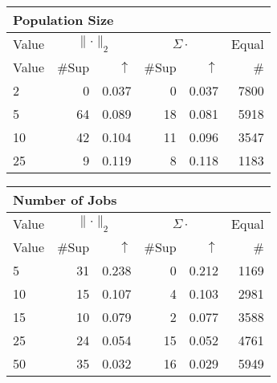 \begin{center}
\renewcommand{\tabcolsep}{4pt}
\renewcommand{\arraystretch}{1.1}
\begin{customnormal}
\begin{tabular}{lrrrrr}
\multicolumn{6}{l}{Population Size}\\
\toprule
\multicolumn{1}{c}{Value} & \multicolumn{2}{c}{$\lVert \cdot \rVert_2$} & \multicolumn{2}{c}{$\Sigma \cdot$} & \multicolumn{1}{c}{Equal} \\ 
\cmidrule(lr){1-1} \cmidrule(lr){2-3} \cmidrule(lr){4-5}  \cmidrule(lr){6-6}
Value & \#Sup & $\uparrow$ & \#Sup & $\uparrow$ & \# \\ 
\midrule
2 & 0 & 0.037 & 0 & 0.037 & 7800 \\ 
5 & 64 & 0.089 & 18 & 0.081 & 5918 \\ 
10 & 42 & 0.104 & 11 & 0.096 & 3547 \\ 
25 & 9 & 0.119 & 8 & 0.118 & 1183 \\ 
\bottomrule
\end{tabular}


\end{customnormal}
\end{center}
\begin{center}
\renewcommand{\tabcolsep}{4pt}
\renewcommand{\arraystretch}{1.1}
\begin{customnormal}
\begin{tabular}{lrrrrr}
\multicolumn{6}{l}{Number of Jobs}\\
\toprule
\multicolumn{1}{c}{Value} & \multicolumn{2}{c}{$\lVert \cdot \rVert_2$} & \multicolumn{2}{c}{$\Sigma \cdot$} & \multicolumn{1}{c}{Equal} \\ 
\cmidrule(lr){1-1} \cmidrule(lr){2-3} \cmidrule(lr){4-5}  \cmidrule(lr){6-6}
Value & \#Sup & $\uparrow$ & \#Sup & $\uparrow$ & \# \\ 
\midrule
5 & 31 & 0.238 & 0 & 0.212 & 1169 \\ 
10 & 15 & 0.107 & 4 & 0.103 & 2981 \\ 
15 & 10 & 0.079 & 2 & 0.077 & 3588 \\ 
25 & 24 & 0.054 & 15 & 0.052 & 4761 \\ 
50 & 35 & 0.032 & 16 & 0.029 & 5949 \\ 
\bottomrule
\end{tabular}


\end{customnormal}
\end{center}
